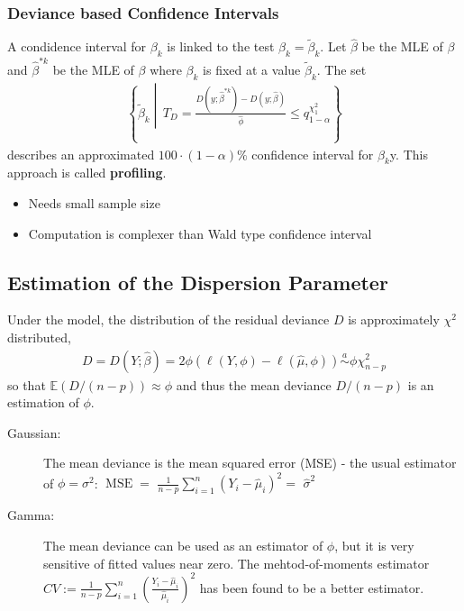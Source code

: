 \subsubsection{Deviance based Confidence Intervals}
A condidence interval for $\beta_k$ is linked
to the test \glqq $\beta_k=\widetilde{\beta}_k$\grqq{}.
Let $\widehat\beta$ be the MLE of $\beta$ and $\widehat\beta^{*k}$ be the MLE
of
$\beta$ where $\beta_k$ is fixed at a value $\widetilde{\beta}_k$.
The set
\begin{align*}
\left\{
\widetilde{\beta}_k
\middle|\,
T_D
=
\frac{D(y;\widehat\beta^{*k}) - D(y;\widehat\beta)}{\widehat\phi} \leq
q_{1-\alpha}^{\chi_1^2}
\right\}
\end{align*}
describes an approximated $100 \cdot (1-\alpha)\%$ confidence interval for
$\beta_k$y.
This approach is called \textbf{profiling}.
\begin{itemize}
\item Needs small sample size
\item Computation is complexer than Wald type confidence interval
\end{itemize}

\subsection{Estimation of the Dispersion Parameter}
Under the model,
the distribution of the residual deviance $D$ is approximately $\chi^2$
distributed,
\begin{align*}
D
=
D(Y;\widehat{\beta})
=
2\phi \left(\ell(Y, \phi) - \ell(\widehat{\mu}, \phi)\right)
\stackrel{a}{\sim}
\phi \chi_{n-p}^2
\end{align*}
so that $\mathbb{E}(D/(n-p)) \approx \phi$ and thus the mean deviance $D/(n-p)$
is an estimation of $\phi$.
\begin{description}
\item[Gaussian:] The mean deviance is the mean squared error (MSE) - the
usual estimator of $\phi = \sigma^2$:\newline
$\operatorname{MSE} = $
$\frac{1}{n-p} \sum_{i=1}^n \left( Y_i - \widehat{\mu}_i \right)^2 = $
$\widehat\sigma^2$
\item[Gamma:] The mean deviance can be used as an estimator of $\phi$,
but it is very sensitive of fitted values near zero.
The mehtod-of-moments estimator
$CV:=\frac{1}{n-p}\sum_{i=1}^n \left(
\frac{Y_i - \widehat\mu_i}{\widehat\mu_i} \right)^2$
has been found to be a better estimator.
\end{description}

